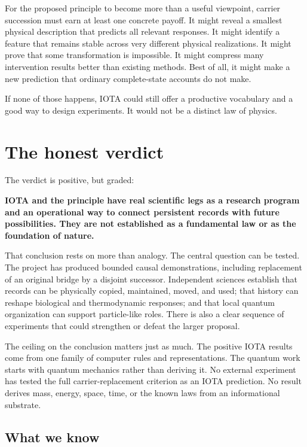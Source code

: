 \documentclass[11pt]{article}
\newcommand{\plainbox}[2]{%
  \begin{center}
  \colorbox{#1}{\parbox{0.92\linewidth}{\vspace{0.35em}#2\vspace{0.35em}}}
  \end{center}}
\begin{document}
For the proposed principle to become more than a useful viewpoint, carrier
succession must earn at least one concrete payoff. It might reveal a smallest
physical description that predicts all relevant responses. It might identify
a feature that remains stable across very different physical realizations. It
might prove that some transformation is impossible. It might compress many
intervention results better than existing methods. Best of all, it might make
a new prediction that ordinary complete-state accounts do not make.

If none of those happens, IOTA could still offer a productive vocabulary and a
good way to design experiments. It would not be a distinct law of physics.

\section*{The honest verdict}

The verdict is positive, but graded:

\plainbox{icppale}{\small\textbf{IOTA and the principle have real scientific
legs as a research program and an operational way to connect persistent
records with future possibilities. They are not established as a fundamental
law or as the foundation of nature.}}

That conclusion rests on more than analogy. The central question can be tested.
The project has produced bounded causal demonstrations, including replacement
of an original bridge by a disjoint successor. Independent sciences establish
that records can be physically copied, maintained, moved, and used; that
history can reshape biological and thermodynamic responses; and that local
quantum organization can support particle-like roles. There is also a clear
sequence of experiments that could strengthen or defeat the larger proposal.

The ceiling on the conclusion matters just as much. The positive IOTA results
come from one family of computer rules and representations. The quantum work
starts with quantum mechanics rather than deriving it. No external experiment
has tested the full carrier-replacement criterion as an IOTA prediction. No
result derives mass, energy, space, time, or the known laws from an
informational substrate.

\subsection*{What we know}
\end{document}
